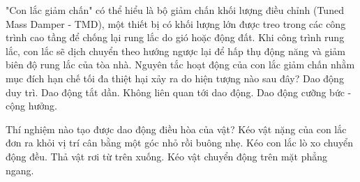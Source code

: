 \begin{ex}%
	"Con lắc giảm chấn" có thể hiểu là bộ giảm chấn khối lượng điều chỉnh (Tuned Mass Damper - TMD), một thiết bị có khối lượng lớn được treo trong các công trình cao tầng để chống lại rung lắc do gió hoặc động đất. Khi công trình rung lắc, con lắc sẽ dịch chuyển theo hướng ngược lại để hấp thụ động năng và giảm biên độ rung lắc của tòa nhà. Nguyên tắc hoạt động của con lắc giảm chấn nhằm mục đích hạn chế tối đa thiệt hại xảy ra do hiện tượng nào sau đây?
	\choice
	{Dao động duy trì.}
	{Dao động tắt dần.}
	{Không liên quan tới dao động.}
	{\True Dao động cưỡng bức - cộng hưởng.}
\end{ex}

\begin{ex}%
	Thí nghiệm nào tạo được dao động điều hòa của vật?
	\choice
	{\True Kéo vật nặng của con lắc đơn ra khỏi vị trí cân bằng một góc nhỏ rồi buông nhẹ.}
	{Kéo con lắc lò xo chuyển động đều.}
	{Thả vật rơi từ trên xuống.}
	{Kéo vật chuyển động trên mặt phẳng ngang.}
\end{ex}

